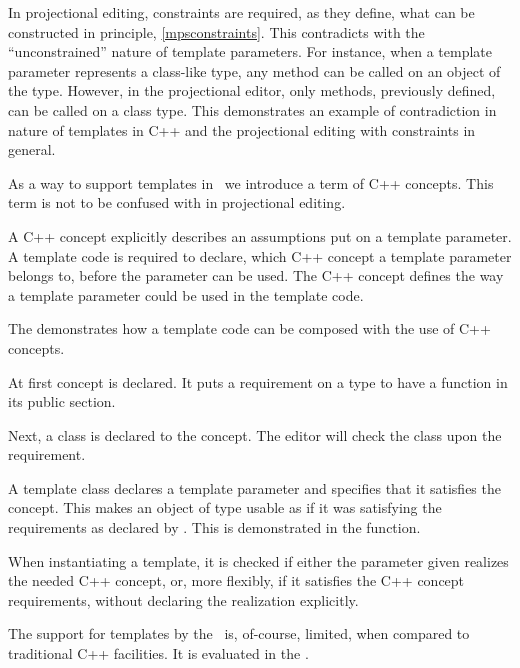In projectional editing, constraints are required, as they define, what can be constructed in principle, \ref{mpsconstraints}.
This contradicts with the ``unconstrained'' nature of template parameters. For instance, when a template parameter represents a 
class-like type, any method can be called on an object of the type. However, in the projectional editor, only methods, previously
defined, can be called on a class type. This demonstrates an example of contradiction in nature of templates in C++ and the projectional
editing with constraints in general.

\pcppsolution

As a way to support templates in \pcpp\ we introduce a term of C++ concepts. This term is not to be confused with  in 
projectional editing.

A C++ concept explicitly describes an assumptions put on a template parameter. A template code is required to declare, which 
C++ concept a template parameter belongs to, before the parameter can be used. The C++ concept defines the way a template 
parameter could be used in the template code.


The  demonstrates how a template code can be composed with the use of C++ concepts.

At first  concept is declared. It puts a requirement on a type to have a function 
 in its public section.

Next, a class  is declared to  the  concept. The
editor will check the class upon the requirement.

A template class  declares a template parameter  and specifies that it 
satisfies the  concept. This makes an object of type  usable as if it was 
satisfying the requirements as declared by . This is demonstrated in the 
function.

When instantiating a template, it is checked if either the parameter given realizes the needed 
C++ concept, or, more flexibly, if it satisfies the C++ concept requirements, without declaring
the realization explicitly.

The support for templates by the \pcpp\ is, of-course, limited, when compared to traditional C++ facilities.
It is evaluated in the .
